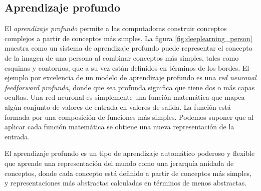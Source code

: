 


\subsection{Aprendizaje profundo}
El \textit{aprendizaje profundo} permite a las computadoras construir conceptos complejos
a partir de conceptos más simples. La figura 
\ref{fig:deeplearning_person} muestra como un sistema de aprendizaje profundo
puede representar el concepto de la imagen de una persona al combinar conceptos más simples, tales
como esquinas y contornos, que a su vez están definidos en términos de los bordes.
El ejemplo por excelencia de un modelo de aprendizaje profundo es una \textit{red neuronal feedforward
profunda}, donde que sea profunda significa que tiene dos o más capas ocultas. Una red neuronal
es simplemente una función matemática que mapea algún conjunto de valores de entrada en 
valores de salida. La función está formada por una composición de funciones más simples.
Podemos suponer que al aplicar cada función matemática se obtiene una nueva representación de la
entrada.\\

\begin{remark}

El aprendizaje profundo es un tipo de aprendizaje automático
poderoso y flexible que aprende una representación del mundo
como una jerarquía anidada de conceptos, donde 
cada concepto está definido a partir de conceptos más simples,
y representaciones más abstractas calculadas en términos
de menos abstractas.

\end{remark}



